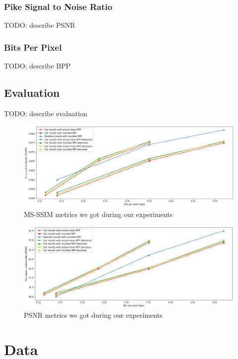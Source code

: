 \subsection{Pike Signal to Noise Ratio}

TODO: describe PSNR

\subsection{Bits Per Pixel}

TODO: describe BPP

\section{Evaluation}

TODO: describe evaluation

\begin{figure}[!ht]
    \centering
    \includegraphics[width=\textwidth]{figure/mssim.png}
    \caption{MS-SSIM metrics we got during our experiments}
    \label{mssim}
\end{figure}

\begin{figure}[!ht]
    \centering
    \includegraphics[width=\textwidth]{figure/psnr.png}
    \caption{PSNR metrics we got during our experiments}
    \label{psnr}
\end{figure}

\chapter{Data}
\label{section:data}

